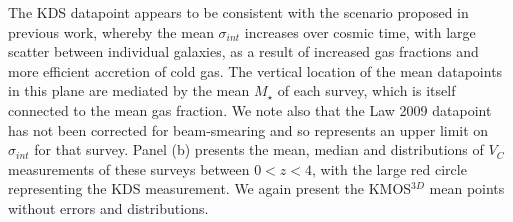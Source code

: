 \documentclass[fleqn,usenatbib]{mn2e}
\begin{document}
\begin{figure*}
{    The KDS datapoint appears to be consistent with the scenario proposed in previous work, whereby the mean $\sigma_{int}$ increases over cosmic time, with large scatter between individual galaxies, as a result of increased gas fractions and more efficient accretion of cold gas.
    The vertical location of the mean datapoints in this plane are mediated by the mean $M_{\star}$ of each survey, which is itself connected to the mean gas fraction. 
    We note also that the Law 2009 datapoint has not been corrected for beam-smearing and so represents an upper limit on $\sigma_{int}$ for that survey. 
    Panel (b) presents the mean, median and distributions of $V_{C}$ measurements of these surveys between $0 < z < 4$, with the large red circle representing the KDS measurement.
    We again present the KMOS$^{3D}$ mean points without errors and distributions.} 
    \label{fig:sigma_and_v_sigma_w_redshift}
\end{figure*}
\end{document}
